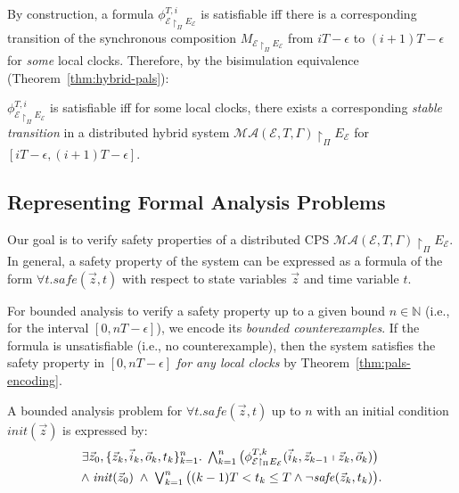 By construction, a formula $\phi_{\mathcal{E} \restriction_{\Pi} E_\mathcal{E}}^{T,i}$ is satisfiable
iff there is a corresponding transition of the synchronous composition $M_{\mathcal{E} \restriction_{\Pi} E_\mathcal{E}}$
from $iT - \epsilon$ to $(i+1)T - \epsilon$ for \emph{some} local clocks.
Therefore, by  the bisimulation equivalence (Theorem~\ref{thm:hybrid-pals}):

\begin{theorem}\label{thm:pals-encoding}
$\phi_{\mathcal{E} \restriction_{\Pi} E_\mathcal{E}}^{T,i}$ is satisfiable 
iff for some local clocks, there exists a corresponding \emph{stable transition} in a distributed hybrid system  
$\mathcal{MA}(\mathcal{E}, T, \Gamma) \restriction_{\Pi} E_\mathcal{E}$   for $[iT - \epsilon,(i+1)T - \epsilon]$.
\end{theorem}

\subsection{Representing Formal Analysis Problems}

Our goal is to verify safety properties
of a distributed CPS $\mathcal{MA}(\mathcal{E}, T, \Gamma) \restriction_{\Pi} E_\mathcal{E}$.
In general, a safety property of the system can be expressed as a formula of the form 
$\forall t.  \mathit{safe}(\vec{z},t)$
with respect to state variables $\vec{z}$ and time variable $t$.


For bounded analysis
to verify %
a safety property %
up to a given bound $n \in \mathbb{N}$
(i.e., for the interval $[0,nT - \epsilon]$),
we encode its \emph{bounded counterexamples}. %
If the formula is unsatisfiable (i.e., no counterexample), 
then the system satisfies the safety property in $[0,nT - \epsilon]$
\emph{for any local clocks} by Theorem~\ref{thm:pals-encoding}.



\begin{definition}
A bounded analysis problem for $\forall t.  \mathit{safe}(\vec{z},t)$
up to $n$ with an initial condition $\mathit{init}(\vec{z})$
is expressed by:
\begin{align*}
\exists \vec{z}_0, \{\vec{z}_k, \vec{i}_k, \vec{o}_k, t_k\}_{k=1}^{n}.\;
\textstyle\bigwedge_{k=1}^{n}
\big(\phi_{\mathcal{E} \restriction_{\Pi} E_\mathcal{E}}^{T,k}(
	\vec{i}_k, \vec{z}_{k-1}
	\shortmid 
	\vec{z}_{k}, \vec{o}_k)\big)
\phantom{.}
\\
\wedge\;
\mathit{init}(\vec{z}_0)
\;\wedge\;
\textstyle\bigvee_{k=1}^{n}
\big(
(k-1)T < t_{k} \leq T
\wedge
\neg\mathit{safe}(\vec{z}_k, t_{k}) 
\big).
\end{align*}
\end{definition}


